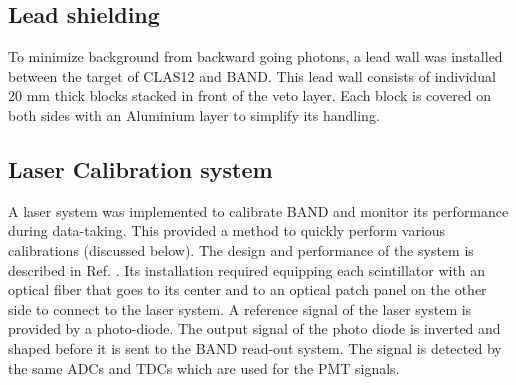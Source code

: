 \documentclass[3p,final,twocolumn]{elsarticle}
\begin{document}
\subsection{Lead shielding}
To minimize background from backward going photons, a lead wall was installed between the target of CLAS12 and BAND. This lead wall consists of individual 20 \si{\milli\meter} thick blocks stacked in front of the veto layer. Each block is covered on both sides with an Aluminium layer to simplify its handling.







\subsection{Laser Calibration system}
A laser system was implemented to calibrate BAND and monitor its performance during data-taking. This 
provided a method to quickly perform various calibrations (discussed below). The design and performance of the system is described in Ref. \cite{band-laser}. 
Its installation required equipping each scintillator with an optical fiber that goes to its center and to an optical patch panel on the other side to connect to the laser system.
A reference signal of the laser system is provided by a photo-diode. The output signal of the photo diode is inverted and shaped before it is sent to the BAND read-out system. The signal is detected by the same ADCs and TDCs which are used for the PMT signals.
\end{document}
